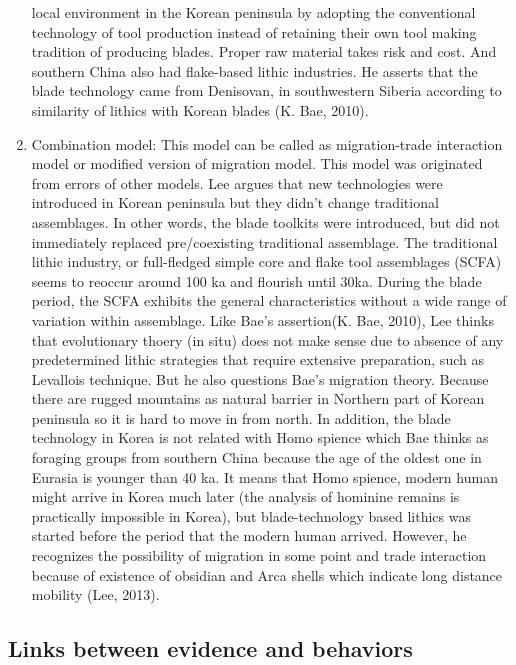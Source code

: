 \documentclass[american,man]{apa6}
\begin{document}
\begin{enumerate}
  local environment in the Korean peninsula by adopting the conventional
  technology of tool production instead of retaining their own tool
  making tradition of producing blades. Proper raw material takes risk
  and cost. And southern China also had flake-based lithic industries.
  He asserts that the blade technology came from Denisovan, in
  southwestern Siberia according to similarity of lithics with Korean
  blades (K. Bae, 2010).
\item
  Combination model: This model can be called as migration-trade
  interaction model or modified version of migration model. This model
  was originated from errors of other models. Lee argues that new
  technologies were introduced in Korean peninsula but they didn't
  change traditional assemblages. In other words, the blade toolkits
  were introduced, but did not immediately replaced pre/coexisting
  traditional assemblage. The traditional lithic industry, or
  full-fledged simple core and flake tool assemblages (SCFA) seems to
  reoccur around 100 ka and flourish until 30ka. During the blade
  period, the SCFA exhibits the general characteristics without a wide
  range of variation within assemblage. Like Bae's assertion(K. Bae,
  2010), Lee thinks that evolutionary thoery (in situ) does not make
  sense due to absence of any predetermined lithic strategies that
  require extensive preparation, such as Levallois technique. But he
  also questions Bae's migration theory. Because there are rugged
  mountains as natural barrier in Northern part of Korean peninsula so
  it is hard to move in from north. In addition, the blade technology in
  Korea is not related with Homo spience which Bae thinks as foraging
  groups from southern China because the age of the oldest one in
  Eurasia is younger than 40 ka. It means that Homo spience, modern
  human might arrive in Korea much later (the analysis of hominine
  remains is practically impossible in Korea), but blade-technology
  based lithics was started before the period that the modern human
  arrived. However, he recognizes the possibility of migration in some
  point and trade interaction because of existence of obsidian and Arca
  shells which indicate long distance mobility (Lee, 2013).
\end{enumerate}

\subsection{Links between evidence and
behaviors}\label{links-between-evidence-and-behaviors}
\end{document}
